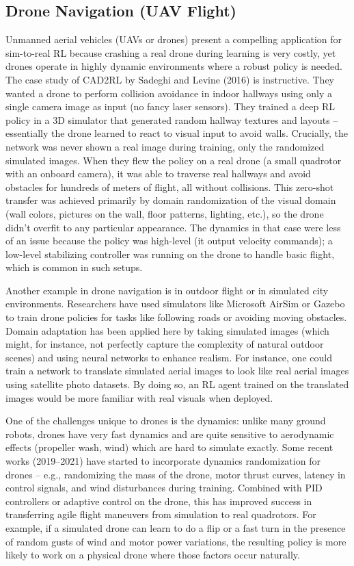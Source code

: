 \subsection{Drone Navigation (UAV Flight)}
Unmanned aerial vehicles (UAVs or drones) present a compelling application for sim-to-real RL because crashing a real drone during learning is very costly, yet drones operate in highly dynamic environments where a robust policy is needed. The case study of CAD2RL by Sadeghi and Levine (2016) is instructive. They wanted a drone to perform collision avoidance in indoor hallways using only a single camera image as input (no fancy laser sensors). They trained a deep RL policy in a 3D simulator that generated random hallway textures and layouts – essentially the drone learned to react to visual input to avoid walls. Crucially, the network was never shown a real image during training, only the randomized simulated images. When they flew the policy on a real drone (a small quadrotor with an onboard camera), it was able to traverse real hallways and avoid obstacles for hundreds of meters of flight, all without collisions. This zero-shot transfer was achieved primarily by domain randomization of the visual domain (wall colors, pictures on the wall, floor patterns, lighting, etc.), so the drone didn’t overfit to any particular appearance. The dynamics in that case were less of an issue because the policy was high-level (it output velocity commands); a low-level stabilizing controller was running on the drone to handle basic flight, which is common in such setups.

Another example in drone navigation is in outdoor flight or in simulated city environments. Researchers have used simulators like Microsoft AirSim or Gazebo to train drone policies for tasks like following roads or avoiding moving obstacles. Domain adaptation has been applied here by taking simulated images (which might, for instance, not perfectly capture the complexity of natural outdoor scenes) and using neural networks to enhance realism. For instance, one could train a network to translate simulated aerial images to look like real aerial images using satellite photo datasets. By doing so, an RL agent trained on the translated images would be more familiar with real visuals when deployed.

One of the challenges unique to drones is the dynamics: unlike many ground robots, drones have very fast dynamics and are quite sensitive to aerodynamic effects (propeller wash, wind) which are hard to simulate exactly. Some recent works (2019–2021) have started to incorporate dynamics randomization for drones – e.g., randomizing the mass of the drone, motor thrust curves, latency in control signals, and wind disturbances during training. Combined with PID controllers or adaptive control on the drone, this has improved success in transferring agile flight maneuvers from simulation to real quadrotors. For example, if a simulated drone can learn to do a flip or a fast turn in the presence of random gusts of wind and motor power variations, the resulting policy is more likely to work on a physical drone where those factors occur naturally.

